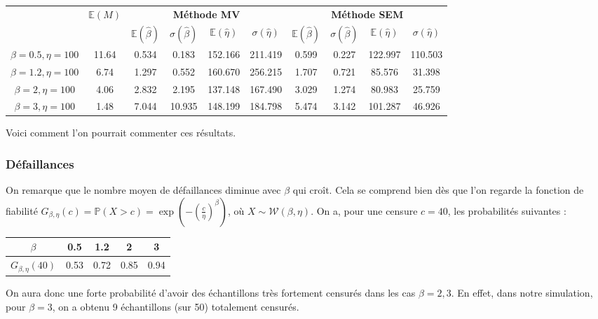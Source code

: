 \documentclass[a4paper]{report}
\begin{document}
 \begin{center}
\begin{tabular}{|c||c||c|c|c|c||c|c|c|c|}
	\hline
	\bf \multirow{2}{1.5cm}{Loi de Weibull} & \multirow{2}{1cm}{$\mathbb{E}(M)$} & \multicolumn{4}{c||}{\bf Méthode MV} & \multicolumn{4}{c|}{ \bf Méthode SEM} \\

	\cline{3-10}
	& & $\mathbb{E}(\hat{\beta})$  &  $\sigma(\hat{\beta})$ &  $\mathbb{E}(\hat{\eta})$ &  $\sigma(\hat{\eta})$ & $\mathbb{E}(\hat{\beta})$  &  $\sigma(\hat{\beta})$ &  $\mathbb{E}(\hat{\eta})$ &  $\sigma(\hat{\eta})$ \\
	\hline
	\bf $\beta=0.5, \eta=100$& 11.64 & 0.534 & 0.183 & 152.166 & 211.419 & 0.599 & 0.227 & 122.997& 110.503 \\
	\hline
	\bf $\beta=1.2, \eta=100$ & 6.74 & 1.297 & 0.552& 160.670 & 256.215& 1.707&0.721 &85.576 &31.398 \\
	\hline
	\bf $\beta=2, \eta=100$ &4.06 &2.832 &2.195 &137.148& 167.490& 3.029& 1.274& 80.983&25.759 \\
	\hline
	\bf $\beta=3, \eta=100$ &1.48 &7.044  &10.935 & 148.199 &184.798 &5.474 &3.142 &101.287 &46.926 \\
	\hline
\end{tabular}
\end{center}

Voici comment l'on pourrait commenter ces résultats.

\subsubsection*{Défaillances}
On remarque que le nombre moyen de défaillances diminue avec $\beta$ qui croît. Cela se comprend bien dès que l'on regarde la fonction de fiabilité $G_{\beta,\eta}(c) = \mathbb{P}(X>c) = \exp\left(-\left(\frac{c}{\eta}\right)^{\beta}\right)$, où $X \sim \mathcal{W}(\beta,\eta)$. On a, pour une censure $c=40$, les probabilités suivantes : 

\begin{center}
\begin{tabular}{|c|c|c|c|c|}
\hline
\bf $\beta$ & 0.5 & 1.2 & 2 & 3 \\
\hline
\bf $G_{\beta,\eta}(40)$ &0.53 & 0.72 &0.85 &0.94\\
\hline 
 \end{tabular}
 \end{center}
  
On aura donc une forte probabilité d'avoir des échantillons très fortement censurés dans les cas $\beta=2,3$. En effet, dans notre simulation, pour $\beta=3$, on a obtenu 9 échantillons (sur 50) totalement censurés. 
  
\end{document}
